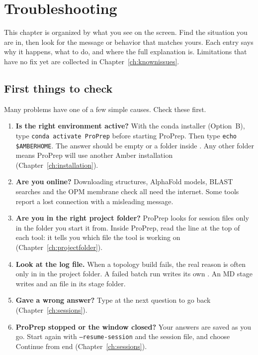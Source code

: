 \chapter{Troubleshooting}\label{ch:troubleshooting}

This chapter is organized by what you see on the screen. Find the situation
you are in, then look for the message or behavior that matches yours. Each
entry says why it happens, what to do, and where the full explanation is.
Limitations that have no fix yet are collected in
Chapter~\ref{ch:knownissues}.

\section{First things to check}\label{sec:troubleshooting-first}

Many problems have one of a few simple causes. Check these first.

\begin{enumerate}
  \item \textbf{Is the right environment active?} With the conda installer
  (Option~B), type \texttt{conda activate ProPrep} before starting ProPrep.
  Then type \texttt{echo \$AMBERHOME}. The answer should be empty or a folder
  inside . Any other folder means ProPrep will use another Amber
  installation (Chapter~\ref{ch:installation}).
  \item \textbf{Are you online?} Downloading structures, AlphaFold models,
  BLAST searches and the OPM membrane check all need the internet. Some
  tools report a lost connection with a misleading message.
  \item \textbf{Are you in the right project folder?} ProPrep looks for
  session files only in the folder you start it from. Inside ProPrep, read
  the  line at the top of each tool: it tells you
  which file the tool is working on (Chapter~\ref{ch:projectfolder}).
  \item \textbf{Look at the log file.} When a topology build fails, the real
  reason is often only in  in the project folder. A failed
  batch run writes its own . An MD stage writes
   and an  file in its stage folder.
  \item \textbf{Gave a wrong answer?} Type  at the next question
  to go back (Chapter~\ref{ch:sessions}).
  \item \textbf{ProPrep stopped or the window closed?} Your answers are saved
  as you go. Start again with \texttt{--resume-session} and the session
  file, and choose \textsf{Continue from end} (Chapter~\ref{ch:sessions}).
\end{enumerate}

